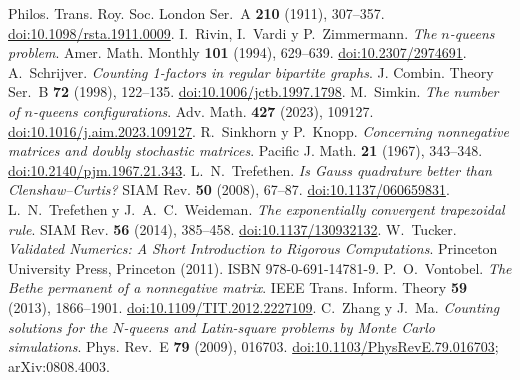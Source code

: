 Philos. Trans. Roy. Soc. London Ser.~A \textbf{210} (1911), 307--357.
\href{https://doi.org/10.1098/rsta.1911.0009}{doi:10.1098/rsta.1911.0009}.
I.~Rivin, I.~Vardi y P.~Zimmermann.
\emph{The $n$-queens problem}.
Amer. Math. Monthly \textbf{101} (1994), 629--639.
\href{https://doi.org/10.2307/2974691}{doi:10.2307/2974691}.
A.~Schrijver.
\emph{Counting 1-factors in regular bipartite graphs}.
J. Combin. Theory Ser.~B \textbf{72} (1998), 122--135.
\href{https://doi.org/10.1006/jctb.1997.1798}{doi:10.1006/jctb.1997.1798}.
M.~Simkin. \emph{The number of $n$-queens configurations}.
Adv. Math. \textbf{427} (2023), 109127.
\href{https://doi.org/10.1016/j.aim.2023.109127}{doi:10.1016/j.aim.2023.109127}.
R.~Sinkhorn y P.~Knopp.
\emph{Concerning nonnegative matrices and doubly stochastic matrices}.
Pacific J. Math. \textbf{21} (1967), 343--348.
\href{https://doi.org/10.2140/pjm.1967.21.343}{doi:10.2140/pjm.1967.21.343}.
L.~N.~Trefethen.
\emph{Is Gauss quadrature better than Clenshaw--Curtis?}
SIAM Rev. \textbf{50} (2008), 67--87.
\href{https://doi.org/10.1137/060659831}{doi:10.1137/060659831}.
L.~N.~Trefethen y J.~A.~C.~Weideman.
\emph{The exponentially convergent trapezoidal rule}.
SIAM Rev. \textbf{56} (2014), 385--458.
\href{https://doi.org/10.1137/130932132}{doi:10.1137/130932132}.
W.~Tucker.
\emph{Validated Numerics: A Short Introduction to Rigorous Computations}.
Princeton University Press, Princeton (2011). ISBN 978-0-691-14781-9.
P.~O.~Vontobel.
\emph{The Bethe permanent of a nonnegative matrix}.
IEEE Trans. Inform. Theory \textbf{59} (2013), 1866--1901.
\href{https://doi.org/10.1109/TIT.2012.2227109}{doi:10.1109/TIT.2012.2227109}.
C.~Zhang y J.~Ma.
\emph{Counting solutions for the $N$-queens and Latin-square problems by Monte Carlo simulations}.
Phys. Rev.~E \textbf{79} (2009), 016703.
\href{https://doi.org/10.1103/PhysRevE.79.016703}{doi:10.1103/PhysRevE.79.016703}; arXiv:0808.4003.
